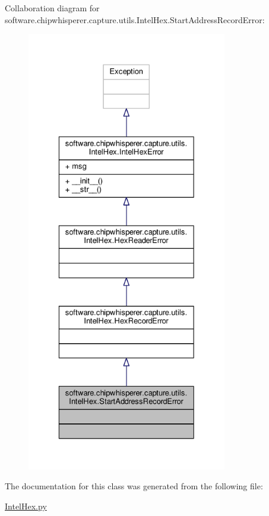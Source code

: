 Collaboration diagram for software.\+chipwhisperer.\+capture.\+utils.\+Intel\+Hex.\+Start\+Address\+Record\+Error\+:\nopagebreak
\begin{figure}[H]
\begin{center}
\leavevmode
\includegraphics[height=550pt]{d4/d55/classsoftware_1_1chipwhisperer_1_1capture_1_1utils_1_1IntelHex_1_1StartAddressRecordError__coll__graph}
\end{center}
\end{figure}


The documentation for this class was generated from the following file\+:\begin{DoxyCompactItemize}
\item 
\hyperlink{IntelHex_8py}{Intel\+Hex.\+py}\end{DoxyCompactItemize}
